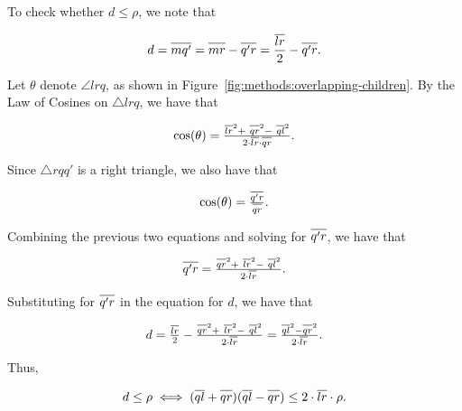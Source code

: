 To check whether $d \leq \rho$, we note that

\begin{equation*}
    d = \overline{m q' \vphantom{l}} = \overline{m r \vphantom{l}} - \overline{q' r \vphantom{l}} = \frac{\overline{l r}}{2} - \overline{q' r \vphantom{l}}.
\end{equation*}

Let $\theta$ denote $\angle l r q$, as shown in Figure~\ref{fig:methods:overlapping-children}.
By the Law of Cosines on $\triangle l r q$, we have that

\begin{equation*}
    \text{cos}(\theta) = \tfrac{\overline{l r}^2 + \ \overline{q r \vphantom{l}}^2 - \ \overline{q l}^2}{2 \cdot \overline{l r} \cdot \overline{q r \vphantom{l}}}.
\end{equation*}

Since $\triangle r q q'$ is a right triangle, we also have that

\begin{equation*}
    \text{cos}(\theta) = \tfrac{\overline{q' r \vphantom{l}}}{\overline{q r \vphantom{l}}}.
\end{equation*}

Combining the previous two equations and solving for $\overline{q' r \vphantom{l}}$, we have that

\begin{equation*}
    \overline{q' r \vphantom{l}} = \tfrac{\overline{q r \vphantom{l}}^2 + \ \overline{l r}^2 - \ \overline{q l}^2}{2 \cdot \overline{l r}}.
\end{equation*}

Substituting for $\overline{q' r \vphantom{l}}$ in the equation for $d$, we have that

\begin{equation*}
    d = \tfrac{\overline{l r}}{2} - \tfrac{\overline{q r \vphantom{l}}^2 + \ \overline{l r}^2 - \ \overline{q l}^2}{2 \cdot \overline{l r}} = \tfrac{\overline{q l}^2 - \overline{q r \vphantom{l}}^2}{2 \cdot \overline{l r}}.
\end{equation*}

Thus,

\begin{equation}
    d \leq \rho \iff (\overline{q l} + \overline{q r \vphantom{l}})(\overline{q l} - \overline{q r \vphantom{l}}) \leq 2 \cdot \overline{l r} \cdot \rho.
    \label{eq:methods:overlapping-children}
\end{equation}

